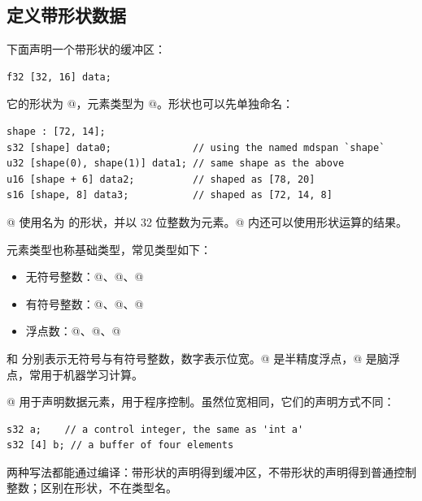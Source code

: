 \subsection*{定义带形状数据}

下面声明一个带形状的缓冲区：

\begin{lstlisting}[language=croqtile,caption={带形状数据的声明}]
f32 [32, 16] data;
\end{lstlisting}

它的形状为 \co@[32, 16]@，元素类型为 @。形状也可以先单独命名：

\begin{lstlisting}[language=croqtile,caption={独立的形状}]
shape : [72, 14];
s32 [shape] data0;              // using the named mdspan `shape`
u32 [shape(0), shape(1)] data1; // same shape as the above
u16 [shape + 6] data2;          // shaped as [78, 20]
s16 [shape, 8] data3;           // shaped as [72, 14, 8]
\end{lstlisting}

@ 使用名为 \co@shape@ 的形状，并以 32 位整数为元素。\co@[]@ 内还可以使用形状运算的结果。

元素类型也称基础类型，常见类型如下：

\begin{itemize}[leftmargin=1.6em]
\item 无符号整数：@、@、@
\item 有符号整数：@、@、@
\item 浮点数：@、@、@
\end{itemize}

\co@u@ 和 \co@s@ 分别表示无符号与有符号整数，数字表示位宽。@ 是半精度浮点，@ 是脑浮点，常用于机器学习计算。

@ 用于声明数据元素，\co@int@ 用于程序控制。虽然位宽相同，它们的声明方式不同：

\begin{lstlisting}[language=croqtile,caption={被拒绝的基础类型}]
s32 a;    // a control integer, the same as 'int a'
s32 [4] b; // a buffer of four elements
\end{lstlisting}

两种写法都能通过编译：带形状的声明得到缓冲区，不带形状的声明得到普通控制整数；区别在形状，不在类型名。
